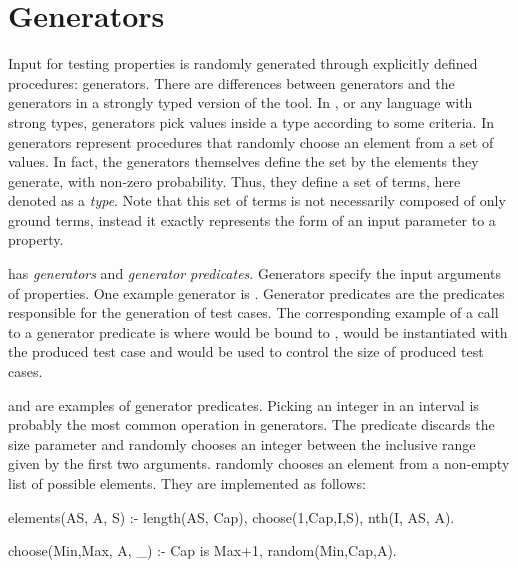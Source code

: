 

\section{Generators}
\label{sec:generators}

Input for testing properties is randomly generated through explicitly
defined procedures: generators.
%
There are  differences between \plqc{} generators and the
generators in a strongly typed version of the tool.
%
In \Haskell{} \QuickCheck{}, or any language with strong types,
generators pick values inside a type according to some criteria.
%
In \plqc{} generators represent procedures that randomly choose an element
from a set of values.
%
In fact, the generators themselves define the set by the elements
they generate, with non-zero probability.
%
Thus, they define a set of terms, here denoted as a \emph{type}.
%
Note that this set of terms is not necessarily composed of only ground
terms, instead it exactly represents the form of an input parameter to a
property.



\plqc{} has {\it generators} and {\it generator
predicates}.
%
Generators specify the input arguments of properties.
%
One example generator is .
%
Generator predicates are the predicates responsible for the generation
of test cases.
%
The corresponding example of a call to a generator predicate is  where  would be bound to ,
 would be instantiated with the produced test case and
 would be used to control the size of produced test cases.
%


%

   and  are examples of generator
predicates.
%
Picking an integer in an interval is probably the most common operation
in generators.
%
The  predicate discards the size parameter and randomly
chooses an integer between the inclusive range given by the first two
arguments.
%
  randomly chooses an element
from a non-empty list of possible elements.
%
They are implemented as follows:
\begin{yapcode}
 elements(AS, A, S) :-
   length(AS, Cap), choose(1,Cap,I,S), nth(I, AS, A).

 choose(Min,Max, A, _) :- Cap is Max+1, random(Min,Cap,A).
\end{yapcode}



